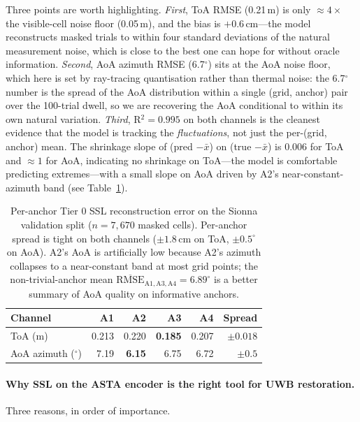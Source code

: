 Three points are worth highlighting. \emph{First}, ToA RMSE
(0.21\,m) is only $\approx 4\times$ the visible-cell noise floor
(0.05\,m), and the bias is $+0.6$\,cm---the model reconstructs
masked trials to within four standard deviations of the natural
measurement noise, which is close to the best one can hope for
without oracle information. \emph{Second}, AoA azimuth RMSE
(6.7$^\circ$) sits at the AoA noise floor, which here is set by
ray-tracing quantisation rather than thermal noise: the 6.7$^\circ$
number is the spread of the AoA distribution within a single
(grid, anchor) pair over the 100-trial dwell, so we are
recovering the AoA conditional to within its own natural
variation. \emph{Third}, R$^2 = 0.995$ on both channels is the
cleanest evidence that the model is tracking the
\emph{fluctuations}, not just the per-(grid, anchor) mean. The
shrinkage slope of (pred $- \bar{x}$) on (true $- \bar{x}$) is
$0.006$ for ToA and $\approx 1$ for AoA, indicating no shrinkage
on ToA---the model is comfortable predicting extremes---with a
small slope on AoA driven by A2's near-constant-azimuth band
(see Table~\ref{tab:tier0-peranchor}).

\begin{table}[t]
\centering
\caption{Per-anchor Tier 0 SSL reconstruction error on the
Sionna validation split ($n{=}7{,}670$ masked cells). Per-anchor
spread is tight on both channels ($\pm 1.8$\,cm on ToA,
$\pm 0.5^\circ$ on AoA). A2's AoA is artificially low because
A2's azimuth collapses to a near-constant band at most grid
points; the non-trivial-anchor mean
$\overline{\mathrm{RMSE}}_{\mathrm{A1,A3,A4}} = 6.89^\circ$ is a
better summary of AoA quality on informative anchors.}
\label{tab:tier0-peranchor}
\small
\begin{tabular}{l rrrr r}
\toprule
Channel & A1 & A2 & A3 & A4 & Spread \\
\midrule
ToA (m)                & 0.213 & 0.220 & \textbf{0.185} & 0.207 & $\pm 0.018$ \\
AoA azimuth ($^\circ$) & 7.19  & \textbf{6.15}  & 6.75  & 6.72  & $\pm 0.5$ \\
\bottomrule
\end{tabular}
\end{table}

\paragraph{Why SSL on the ASTA encoder is the right tool for UWB restoration.}
Three reasons, in order of importance.

